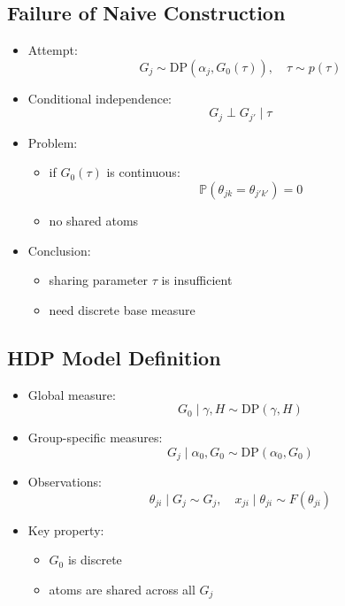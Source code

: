 \documentclass[12pt,oneside]{book}
\numberwithin{equation}{section}
\theoremstyle{definition}
\theoremstyle{plain}
\theoremstyle{remark}
\begin{document}
\subsection*{Failure of Naive Construction}

\begin{itemize}
\item Attempt:
\[
G_j \sim \text{DP}(\alpha_j, G_0(\tau)), \quad \tau \sim p(\tau)
\]

\item Conditional independence:
\[
G_j \perp G_{j'} \mid \tau
\]

\item Problem:
\begin{itemize}
\item if $G_0(\tau)$ is continuous:
\[
\mathbb{P}(\theta_{jk} = \theta_{j'k'}) = 0
\]
\item no shared atoms
\end{itemize}

\item Conclusion:
\begin{itemize}
\item sharing parameter $\tau$ is insufficient
\item need discrete base measure
\end{itemize}
\end{itemize}

\subsection*{HDP Model Definition}

\begin{itemize}
\item Global measure:
\[
G_0 \mid \gamma, H \sim \text{DP}(\gamma, H)
\]

\item Group-specific measures:
\[
G_j \mid \alpha_0, G_0 \sim \text{DP}(\alpha_0, G_0)
\]

\item Observations:
\[
\theta_{ji} \mid G_j \sim G_j, \quad x_{ji} \mid \theta_{ji} \sim F(\theta_{ji})
\]

\item Key property:
\begin{itemize}
\item $G_0$ is discrete
\item atoms are shared across all $G_j$
\end{itemize}
\end{itemize}
\end{document}
